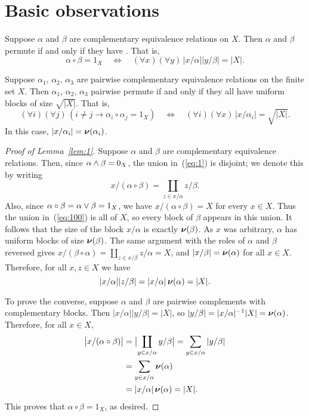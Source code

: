 \section{Basic observations}
\begin{lemma}
\label{lem:1}
Suppose $\alpha$ and $\beta$ are complementary equivalence relations on
$X$. Then $\alpha$ and $\beta$ permute if and only if they have \cubs.
That is,
\[
\alpha \circ \beta =1_X \quad \Longleftrightarrow \quad (\forall x)(\forall y)\,
|x/\alpha| |y/\beta| = |X|.
\]
\end{lemma}
\begin{corollary}
\label{cor:1}
Suppose $\alpha_1$, $\alpha_2$, $\alpha_3$ are pairwise complementary
equivalence relations on the finite set $X$. 
Then  $\alpha_1$, $\alpha_2$, $\alpha_3$ pairwise permute if and only if they
all have uniform blocks of size $\sqrt{|X|}$.  That is,
\[
(\forall i)(\forall j) \, (i\neq j \longrightarrow \alpha_i \circ \alpha_j = 1_X)
\quad \Longleftrightarrow \quad (\forall i)(\forall x) \, |x/\alpha_i| =
\sqrt{|X|}.
\]
In this case,  $|x/\alpha_i| =\operatorname{\boldsymbol{\nu}}(\alpha_i)$. 
\end{corollary}
\begin{proof}[Proof of Lemma~\ref{lem:1}]
Suppose $\alpha$ and $\beta$ are complementary
equivalence relations.  Then, since $\alpha \wedge \beta = 0_X$,
the union in~(\ref{eq:1}) is disjoint; we denote this by writing
  \begin{equation}
    \label{eq:100}
x/(\alpha\circ \beta) = \coprod_{z \in x/\alpha} z/\beta.
  \end{equation}
Also, since 
$\alpha \circ \beta = \alpha \vee \beta = 1_X$, we have 
$x/(\alpha\circ \beta) =  X$ for 
every $x\in X$.
Thus the union in~(\ref{eq:100}) is all of $X$,
so every block of $\beta$ appears in this union.
It follows that the size of the block $x/\alpha$ is exactly $\operatorname{\boldsymbol{\nu}}(\beta)$. 
As $x$ was arbitrary, $\alpha$ has uniform
blocks of size %
$\operatorname{\boldsymbol{\nu}}(\beta)$. 
The same argument with the roles of $\alpha$ and $\beta$ reversed
gives
$x/(\beta \circ \alpha) = \coprod_{z \in x/\beta} z/\alpha = X$, 
and  $|x/\beta| =\operatorname{\boldsymbol{\nu}}(\alpha)$ for all $x\in X$.  Therefore, 
for all $x, z\in X$ we have
\[
|x/\alpha| |z/\beta| 
 = |x/\alpha| \operatorname{\boldsymbol{\nu}}(\alpha) = |X|.
\]

To prove the converse, suppose $\alpha$ and $\beta$ are pairwise complements
with complementary blocks.  Then $|x/\alpha| |y/\beta| = |X|$, 
so $|y/\beta| = |x/\alpha|^{-1}  |X|  = \operatorname{\boldsymbol{\nu}}(\alpha)$. 
Therefore, for all $x\in X$,
\begin{align*}
\bigl|x/(\alpha\circ \beta)\bigr| &= \bigl|\coprod_{y\in x/\alpha} y/\beta\bigr|
= \sum_{y \in x/\alpha} |y/\beta|\\
&= \sum_{y \in x/\alpha} \operatorname{\boldsymbol{\nu}}(\alpha) \\
&= |x/\alpha|\operatorname{\boldsymbol{\nu}}(\alpha) = |X|.
\end{align*}
This proves that $\alpha\circ \beta = 1_X$, as desired.
\end{proof}

